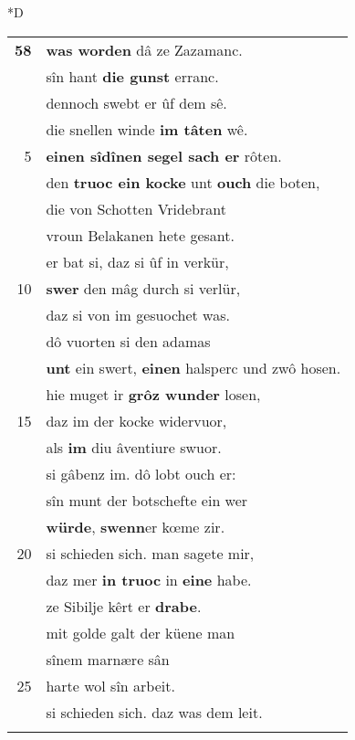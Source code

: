 \documentclass[8pt,a4paper,notitlepage]{article}
\begin{document}
\begin{table}[ht]
\begin{minipage}[t]{0.5\linewidth}
\small
\begin{center}*D
\end{center}
\begin{tabular}{rl}
\textbf{58} & \textbf{was worden} dâ ze Zazamanc.\\ 
 & sîn hant \textbf{die gunst} erranc.\\ 
 & dennoch swebt er ûf dem sê.\\ 
 & die snellen winde \textbf{im tâten} wê.\\ 
5 & \textbf{einen sîdînen segel sach er} rôten.\\ 
 & den \textbf{truoc ein kocke} unt \textbf{ouch} die boten,\\ 
 & die von Schotten Vridebrant\\ 
 & vroun Belakanen hete gesant.\\ 
 & er bat si, daz si ûf in verkür,\\ 
10 & \textbf{swer} den mâg durch si verlür,\\ 
 & daz si von im gesuochet was.\\ 
 & dô vuorten si den adamas\\ 
 & \textbf{unt} ein swert, \textbf{einen} halsperc und zwô hosen.\\ 
 & hie muget ir \textbf{grôz wunder} losen,\\ 
15 & daz im der kocke widervuor,\\ 
 & als \textbf{im} diu âventiure swuor.\\ 
 & si gâbenz im. dô lobt ouch er:\\ 
 & sîn munt der botschefte ein wer\\ 
 & \textbf{würde}, \textbf{swenn}er kœme zir.\\ 
20 & si schieden sich. man sagete mir,\\ 
 & daz mer \textbf{in truoc} in \textbf{eine} habe.\\ 
 & ze Sibilje kêrt er \textbf{drabe}.\\ 
 & mit golde galt der küene man\\ 
 & sînem marnære sân\\ 
25 & harte wol sîn arbeit.\\ 
 & si schieden sich. daz was dem leit.\\ 
 & \textbf{\begin{Large}D\end{Large}â} ze Spane ime lande\\ 

\end{tabular}
\end{minipage}
\end{table}
\end{document}
